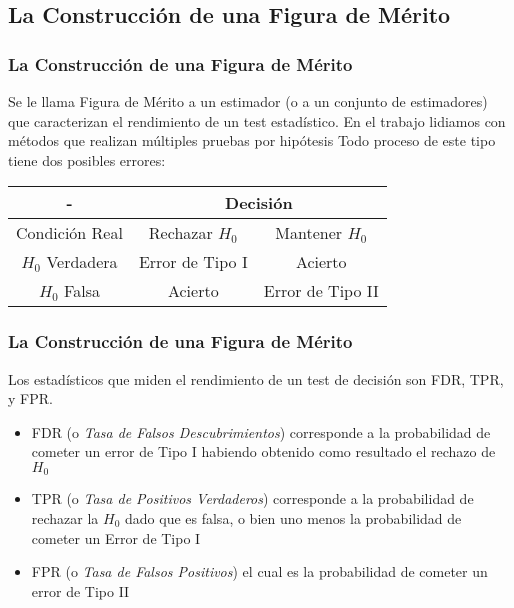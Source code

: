 \documentclass[10pt]{beamer}
\begin{document}
\subsection{La Construcci\'on de una Figura de M\'erito}
\begin{frame}\frametitle{La Construcci\'on de una Figura de M\'erito}
 Se le llama Figura de M\'erito a un estimador (o a un conjunto de estimadores) que caracterizan
el rendimiento de un test estad\'{i}stico.
En el trabajo lidiamos con m\'etodos que realizan m\'ultiples pruebas por hip\'otesis
Todo proceso de este tipo tiene dos posibles errores: 
\begin{center}
\begin{tabular}{|c|c|l|}
\hline
- & \multicolumn{2}{c|}{Decisi\'on}\\
\hline \hline
Condici\'on Real & Rechazar $H_0$ & \multicolumn{1}{c|}{Mantener $H_0$}\\
\hline
$H_0$ Verdadera & Error de Tipo I & \multicolumn{1}{c|}{Acierto}\\
\hline
$H_0$ Falsa & Acierto & \multicolumn{1}{c|}{Error de Tipo II}\\
\hline
\end{tabular}
\end{center}
\end{frame}
\begin{frame} \frametitle{La Construcci\'on de una Figura de M\'erito}
 Los estad\'{i}sticos que miden el rendimiento de un test de decisi\'on son FDR, TPR, y FPR.
\begin{itemize}
 \item FDR (o \textit{Tasa de Falsos Descubrimientos}) corresponde a la probabilidad 
 de cometer un error de Tipo I habiendo obtenido como resultado el rechazo de $H_0$
 \item TPR (o \textit{Tasa de Positivos Verdaderos}) corresponde a la probabilidad de 
 rechazar la $H_0$ dado que es falsa, o bien uno menos la probabilidad de cometer un Error de Tipo I
\item FPR (o \textit{Tasa de Falsos Positivos}) el cual es la probabilidad de cometer un error de Tipo II
\end{itemize}
\end{frame}
\end{document}
